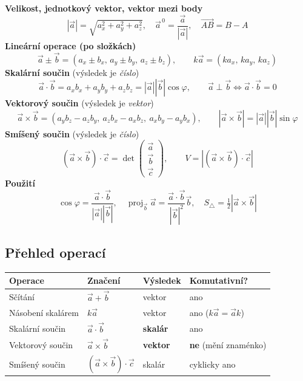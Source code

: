 \documentclass[a4paper,11pt]{article}
\newcommand{\abs}[1]{\left\lvert #1\right\rvert}
\DeclareMathOperator{\proj}{proj}
\begin{document}
\begin{tcolorbox}[enhanced,breakable,colback=primary!4,colframe=primary,
  title={\bfseries Přehled vzorců (3D)},fonttitle=\bfseries,coltitle=white,colbacktitle=primary]
\textbf{Velikost, jednotkový vektor, vektor mezi body}
\[
  \abs{\vec a}=\sqrt{a_x^2+a_y^2+a_z^2},\quad
  \vec a^{\,0}=\frac{\vec a}{\abs{\vec a}},\quad
  \overrightarrow{AB}=B-A
\]
\textbf{Lineární operace (po složkách)}
\[
  \vec a\pm\vec b=(a_x\pm b_x,\,a_y\pm b_y,\,a_z\pm b_z),\qquad
  k\vec a=(ka_x,\,ka_y,\,ka_z)
\]
\textbf{Skalární součin} (výsledek je \emph{číslo})
\[
  \vec a\cdot\vec b=a_xb_x+a_yb_y+a_zb_z=\abs{\vec a}\abs{\vec b}\cos\varphi,\qquad
  \vec a\perp\vec b\iff\vec a\cdot\vec b=0
\]
\textbf{Vektorový součin} (výsledek je \emph{vektor})
\[
  \vec a\times\vec b=(a_yb_z-a_zb_y,\ a_zb_x-a_xb_z,\ a_xb_y-a_yb_x),\qquad
  \abs{\vec a\times\vec b}=\abs{\vec a}\abs{\vec b}\sin\varphi
\]
\textbf{Smíšený součin} (výsledek je \emph{číslo})
\[
  (\vec a\times\vec b)\cdot\vec c=\det\begin{pmatrix}\vec a\\ \vec b\\ \vec c\end{pmatrix},\qquad
  V=\abs{(\vec a\times\vec b)\cdot\vec c}
\]
\textbf{Použití}
\[
  \cos\varphi=\frac{\vec a\cdot\vec b}{\abs{\vec a}\abs{\vec b}},\quad
  \proj_{\vec b}\vec a=\frac{\vec a\cdot\vec b}{\abs{\vec b}^2}\vec b,\quad
  S_\triangle=\tfrac12\abs{\vec a\times\vec b}
\]
\end{tcolorbox}

\subsection{Přehled operací}

\begin{center}
\small
\begin{tabular}{@{}llll@{}}
\toprule
\textbf{Operace} & \textbf{Značení} & \textbf{Výsledek} & \textbf{Komutativní?}\\
\midrule
Sčítání            & $\vec a+\vec b$            & vektor & ano\\
Násobení skalárem  & $k\vec a$                  & vektor & ano ($k\vec a=\vec a k$)\\
Skalární součin    & $\vec a\cdot\vec b$        & \textbf{skalár} & ano\\
Vektorový součin   & $\vec a\times\vec b$       & \textbf{vektor} & \textbf{ne} (mění znaménko)\\
Smíšený součin     & $(\vec a\times\vec b)\cdot\vec c$ & skalár & cyklicky ano\\
\bottomrule
\end{tabular}
\end{center}
\end{document}
